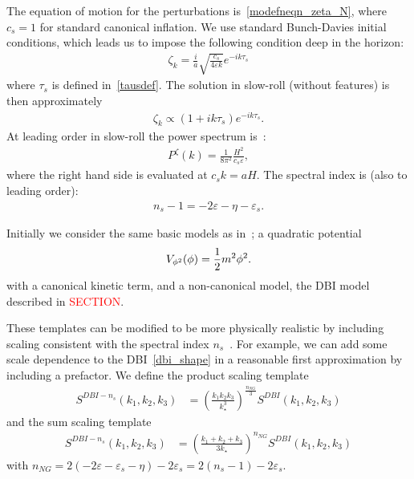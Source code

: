 The equation of motion for the perturbations is~\eqref{modefneqn_zeta_N},
where $c_s=1$ for standard canonical inflation.
We use standard Bunch-Davies initial conditions,
which leads us to impose the following condition deep in the horizon:
\begin{align}\label{bd_ic}
\zeta_k = \frac{i}{a}\sqrt{\frac{c_s}{4\varepsilon k}} e^{-ik\tau_s}
\end{align}
where $\tau_s$ is defined in~\eqref{tausdef}.
The solution in slow-roll (without features) is then approximately
\begin{align}\label{modefnsapprox}
    \zeta_k \propto (1+ik\tau_s)e^{-ik\tau_s}.
\end{align}
At leading order in slow-roll the power spectrum is~\cite{mukhanov_1999,chen_ng_0605}:
\begin{align}
P^{\zeta}(k) = \frac{1}{8\pi^2}\frac{H^2}{c_s\varepsilon},
\end{align}
where the right hand side is evaluated at $c_{s}k=aH$.
The spectral index is (also to leading order):
\begin{align}
n_s-1 = -2\varepsilon-\eta-\varepsilon_s.
\end{align}


Initially we consider the same basic models as in~\cite{Funakoshi};
a quadratic potential
\begin{align}\label{eq:quadratic_potential}
    V_{\phi^2}(\phi) = \frac{1}{2}m^2\phi^2.
\end{align}
with a canonical kinetic term,
and a non-canonical model,
the DBI model described in \textcolor{red}{SECTION}.


These templates can be modified to be more physically realistic by including
scaling consistent with the spectral index $n_s$~\cite{Planck_NG_2015}.
For example, we can add some scale dependence to the DBI~\eqref{dbi_shape}
in a reasonable first approximation by including a prefactor.
We define the product scaling template
\begin{align}\label{dbi_prod_shape}
    S^{DBI-n_s}(k_1,k_2,k_3) &= {\left(\frac{k_1k_2k_3}{k^3_\star}\right)}^{\frac{n_{NG}}{3}}S^{DBI}(k_1,k_2,k_3)
\end{align}
and the sum scaling template
\begin{align}\label{dbi_sum_shape}
    S^{DBI-n_s}(k_1,k_2,k_3) &= {\left(\frac{k_1+k_2+k_3}{3k_\star}\right)}^{n_{NG}}S^{DBI}(k_1,k_2,k_3)
\end{align}
with $n_{NG}=2(-2\varepsilon-\varepsilon_s-\eta)-2\varepsilon_s=2(n_s-1)-2\varepsilon_s$.


